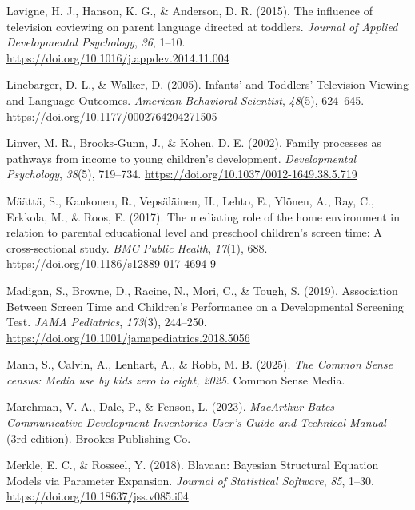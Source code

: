 \documentclass[
  man,
  floatsintext,
  longtable,
  nolmodern,
  notxfonts,
  notimes,
  colorlinks=true,linkcolor=blue,citecolor=blue,urlcolor=blue]{apa7}
\newlength{\cslhangindent}
\newenvironment{CSLReferences}[2] %
 {\begin{list}{}{%
  \setlength{\itemindent}{0pt}
  \setlength{\leftmargin}{0pt}
  \setlength{\parsep}{0pt}
  \ifodd #1
   \setlength{\leftmargin}{\cslhangindent}
   \setlength{\itemindent}{-1\cslhangindent}
  \fi
  \setlength{\itemsep}{#2\baselineskip}}}
 {\end{list}}
\begin{document}
\begin{CSLReferences}{1}{0}
Lavigne, H. J., Hanson, K. G., \& Anderson, D. R. (2015). The influence
of television coviewing on parent language directed at toddlers.
\emph{Journal of Applied Developmental Psychology}, \emph{36}, 1--10.
\url{https://doi.org/10.1016/j.appdev.2014.11.004}

Linebarger, D. L., \& Walker, D. (2005). Infants' and {Toddlers}'
{Television Viewing} and {Language Outcomes}. \emph{American Behavioral
Scientist}, \emph{48}(5), 624--645.
\url{https://doi.org/10.1177/0002764204271505}

Linver, M. R., Brooks-Gunn, J., \& Kohen, D. E. (2002). Family processes
as pathways from income to young children's development.
\emph{Developmental Psychology}, \emph{38}(5), 719--734.
\url{https://doi.org/10.1037/0012-1649.38.5.719}

Määttä, S., Kaukonen, R., Vepsäläinen, H., Lehto, E., Ylönen, A., Ray,
C., Erkkola, M., \& Roos, E. (2017). The mediating role of the home
environment in relation to parental educational level and preschool
children's screen time: A cross-sectional study. \emph{BMC Public
Health}, \emph{17}(1), 688.
\url{https://doi.org/10.1186/s12889-017-4694-9}

Madigan, S., Browne, D., Racine, N., Mori, C., \& Tough, S. (2019).
Association {Between Screen Time} and {Children}'s {Performance} on a
{Developmental Screening Test}. \emph{JAMA Pediatrics}, \emph{173}(3),
244--250. \url{https://doi.org/10.1001/jamapediatrics.2018.5056}

Mann, S., Calvin, A., Lenhart, A., \& Robb, M. B. (2025). \emph{The
{Common Sense} census: {Media} use by kids zero to eight, 2025}. Common
Sense Media.

Marchman, V. A., Dale, P., \& Fenson, L. (2023). \emph{{MacArthur-Bates
Communicative Development Inventories User}'s {Guide} and {Technical
Manual}} (3rd edition). Brookes Publishing Co.

Merkle, E. C., \& Rosseel, Y. (2018). Blavaan: {Bayesian Structural
Equation Models} via {Parameter Expansion}. \emph{Journal of Statistical
Software}, \emph{85}, 1--30. \url{https://doi.org/10.18637/jss.v085.i04}


\end{CSLReferences}
\end{document}
